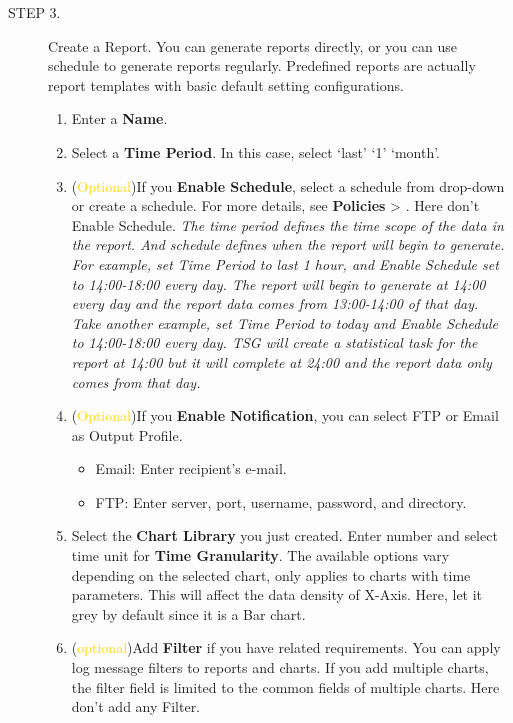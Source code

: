 \begin{description}
    \item[STEP 3.]	Create a Report. You can generate reports directly, or you can use schedule to generate reports regularly. Predefined reports are actually report templates with basic default setting configurations.
    \begin{enumerate}
        \item  Enter a \textbf{Name}.
        \item Select a \textbf{Time Period}. In this case, select ‘last’ ‘1’ ‘month’.
        \item (\textcolor{gold}{Optional})If you \textbf{Enable Schedule}, select a schedule from drop-down or create a schedule. For more details, see \textbf{Policies} > \textbf{\hyperlink{link:Schedules}{\color{linkblue}{Schedules}}}. Here don’t Enable Schedule.
        \notemark\textit{The time period defines the time scope of the data in the report. And schedule defines when the report will begin to generate. For example, set Time Period to last 1 hour, and Enable Schedule set to 14:00-18:00 every day. The report will begin to generate at 14:00 every day and the report data comes from 13:00-14:00 of that day. Take another example, set Time Period to today and Enable Schedule to 14:00-18:00 every day. TSG will create a statistical task for the report at 14:00 but it will complete at 24:00 and the report data only comes from that day.}
        \item (\textcolor{gold}{Optional})If you \textbf{Enable Notification}, you can select FTP or Email as Output Profile. 
        \begin{itemize}
            \item Email: Enter recipient's e-mail.
            \item FTP: Enter server, port, username, password, and directory.
        \end{itemize}
        \item Select the \textbf{Chart Library} you just created. Enter number and select time unit for \textbf{Time Granularity}. The available options vary depending on the selected chart, only applies to charts with time parameters. This will affect the data density of X-Axis. Here, let it grey by default since it is a Bar chart.
        \item (\textcolor{gold}{optional})Add \textbf{Filter} if you have related requirements. You can apply log message filters to reports and charts. 
        If you add multiple charts, the filter field is limited to the common fields of multiple charts. Here don’t add any Filter.

\end{enumerate}
\end{description}
